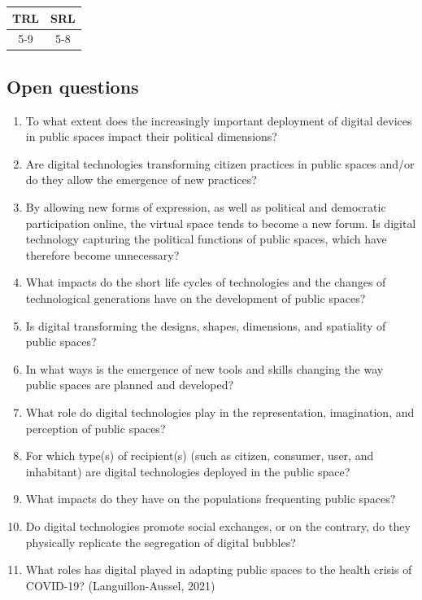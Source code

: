 \documentclass[
]{book}
\providecommand{\tightlist}{%
  \setlength{\itemsep}{0pt}\setlength{\parskip}{0pt}}
\begin{document}
\begin{longtable}[]{@{}cc@{}}
\toprule
TRL & SRL\tabularnewline
\midrule
\endhead
5-9 & 5-8\tabularnewline
\bottomrule
\end{longtable}

\hypertarget{open-questions-3}{%
\subsection*{Open questions}\label{open-questions-3}}

\begin{enumerate}
\def\labelenumi{\arabic{enumi}.}
\tightlist
\item
  To what extent does the increasingly important deployment of digital devices in public spaces impact their political dimensions?
\item
  Are digital technologies transforming citizen practices in public spaces and/or do they allow the emergence of new practices?
\item
  By allowing new forms of expression, as well as political and democratic participation online, the virtual space tends to become a new forum. Is digital technology capturing the political functions of public spaces, which have therefore become unnecessary?
\item
  What impacts do the short life cycles of technologies and the changes of technological generations have on the development of public spaces?
\item
  Is digital transforming the designs, shapes, dimensions, and spatiality of public spaces?
\item
  In what ways is the emergence of new tools and skills changing the way public spaces are planned and developed?
\item
  What role do digital technologies play in the representation, imagination, and perception of public spaces?
\item
  For which type(s) of recipient(s) (such as citizen, consumer, user, and inhabitant) are digital technologies deployed in the public space?
\item
  What impacts do they have on the populations frequenting public spaces?
\item
  Do digital technologies promote social exchanges, or on the contrary, do they physically replicate the segregation of digital bubbles?
\item
  What roles has digital played in adapting public spaces to the health crisis of COVID-19?
  (Languillon-Aussel, 2021)
\end{enumerate}
\end{document}
